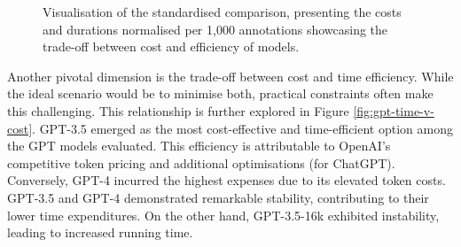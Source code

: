 \begin{figure}[htbp]
  \centering
  \quad 
  \caption[Time Cost Analysis]{Visualisation of the standardised comparison, presenting the costs and durations normalised per 1,000 annotations  showcasing the trade-off between cost and efficiency of models.}\label{fig:gpt-relative-cost}
\end{figure}

Another pivotal dimension is the trade-off between cost and time efficiency. While the ideal scenario would be to minimise both, practical constraints often make this challenging. This relationship is further explored in Figure \ref{fig:gpt-time-v-cost}.
GPT-3.5 emerged as the most cost-effective and time-efficient option among the GPT models evaluated. This efficiency is attributable to OpenAI's competitive token pricing and additional optimisations (for ChatGPT). Conversely, GPT-4 incurred the highest expenses due to its elevated token costs. GPT-3.5 and GPT-4 demonstrated remarkable stability, contributing to their lower time expenditures. On the other hand, GPT-3.5-16k exhibited instability, leading to increased running time. %

